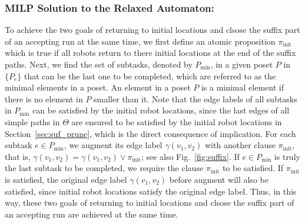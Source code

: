\documentclass[Afour,sageh,times]{sagej}
\begin{document}
{{{  \subsubsection{MILP Solution to the Relaxed Automaton:}\label{sec:suf_milp} To achieve the two goals of returning to initial locations and clsose the suffix part of an accepting run at the same time, we first define an atomic proposition $\pi_{\text{init}}$ which is true if all robots return to there initial locations at the end of the suffix paths. Next, we find the set of subtasks, denoted by $P_{\text{min}}$, in a given poset $P$ in $\{P_e\}$ that can be the last one to be completed, which are referred to as the minimal elements in a poset. An element in a poset $P$  is a minimal element if there is no element in $P$ smaller than it. Note that the edge labels of all subtasks in $P_{\text{min}}$ can be satisfied by the initial robot locations, since the last edges of all simple paths in $\Theta$ are ensured to be satisfied by the initial robot locations in Section~\ref{sec:suf_prune}, which is the direct consequence of implication.  For each subtask $e \in P_{\text{min}}$, we augment its edge label $\gamma(v_1, v_2)$ with another clause $\pi_{\text{init}}$, that is, $\gamma(v_1, v_2) = \gamma(v_1, v_2) \vee \pi_{\text{init}}$; see also Fig.~\ref{fig:suffix}. If $e \in P_{\text{min}}$ is truly the last subtask to be completed, we require the clause $ \pi_{\text{init}}$  to be satisfied. If $\pi_{\text{init}}$ is satisfied, the original edge label $\gamma(v_1, v_2)$ before augment will also be satisfied, since initial robot locations satisfy the original edge label. Thus, in this way, these two goals of returning to initial locations and clsose the suffix part of an accepting run are achieved  at the same time.
}}}
\end{document}
